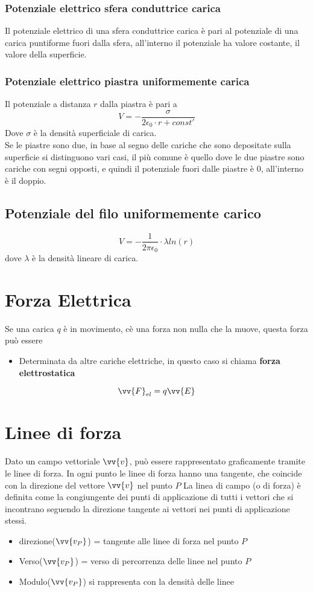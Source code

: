 \documentclass[a4paper]{report}
\begin{document}
  \subsubsection{Potenziale elettrico sfera conduttrice carica}
  Il potenziale elettrico di una sfera conduttrice carica è pari al potenziale di una carica puntiforme fuori dalla sfera, all'interno il potenziale ha valore costante, il valore della superficie.
  \subsubsection{Potenziale elettrico piastra uniformemente carica}
  Il potenziale a distanza $r$ dalla piastra è pari a
  $$ V = - \frac{\sigma}{2 \epsilon_0 \cdot r + const'}$$
  Dove $\sigma$ è la densità superficiale di carica.\\
  Se le piastre sono due, in base al segno delle cariche che sono depositate sulla superficie si distinguono vari casi, il più comune è quello dove le due piastre sono cariche con segni opposti, e quindi il potenziale fuori dalle piastre è $0$, all'interno è il doppio.
  \subsection{Potenziale del filo uniformemente carico}
  $$ V = - \frac{1}{2\pi \epsilon_0} \cdot \lambda ln(r)$$
  dove $\lambda$ è la densità lineare di carica.


  \section{Forza Elettrica}
  Se una carica $q$ è in movimento, cè una forza non nulla che la muove, questa forza può essere
  \begin{itemize}
    \item Determinata da altre cariche elettriche, in questo caso si chiama \textbf{forza elettrostatica}
  \end{itemize}
  $$\vv{F}_{el} = q \vv{E}$$

  \section{Linee di forza}
  Dato un campo vettoriale $\vv{v}$, può essere rappresentato graficamente tramite le linee di forza. In ogni punto le linee di forza hanno una tangente, che coincide con la direzione del vettore $\vv{v}$ nel punto $P$
  La linea di campo (o di forza) è definita come la congiungente dei punti di applicazione di tutti i vettori che si incontrano seguendo la direzione tangente ai vettori nei punti di applicazione stessi.
  \begin{itemize}
    \item direzione($\vv{v_P}$) = tangente alle linee di forza nel punto $P$
    \item Verso($\vv{v_P}$) = verso di percorrenza delle linee nel punto $P$
    \item Modulo($\vv{v_P}$) si rappresenta con la densità delle linee
  \end{itemize}
\end{document}
